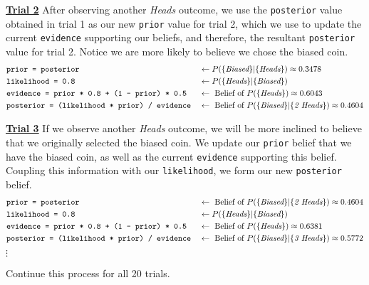 \underline{\textbf{Trial 2}}
\newline
After observing another \textit{Heads} outcome, we use the \texttt{posterior} value obtained in trial 1 as our new \texttt{prior} value for trial 2, which we use to update the current \texttt{evidence} supporting our beliefs, and therefore, the resultant \texttt{posterior} value for trial 2. Notice we are more likely to believe we chose the biased coin.
\begin{align*}
    &\texttt{prior = posterior} &&\leftarrow P(\{\textit{Biased}\} | \{\textit{Heads}\}) \approx 0.3478 \\
    &\texttt{likelihood = 0.8} &&\leftarrow P(\{\textit{Heads}\} | \{\textit{Biased}\}) \\
    &\texttt{evidence = prior * 0.8 + (1 - prior) * 0.5} &&\leftarrow \textnormal{ Belief of } P(\{\textit{Heads}\}) \approx 0.6043 \\
    &\texttt{posterior = (likelihood * prior) / evidence} &&\leftarrow \textnormal{ Belief of } P(\{\textit{Biased}\} | \{\textit{2 Heads}\}) \approx 0.4604
\end{align*}

\underline{\textbf{Trial 3}}
\newline
If we observe another \textit{Heads} outcome, we will be more inclined to believe that we originally selected the biased coin. We update our \texttt{prior} belief that we have the biased coin, as well as the current \texttt{evidence} supporting this belief. Coupling this information with our \texttt{likelihood}, we form our new \texttt{posterior} belief.
\begin{align*}
    &\texttt{prior = posterior} &&\leftarrow \textnormal{ Belief of } P(\{\textit{Biased}\} | \{\textit{2 Heads}\}) \approx 0.4604 \\
    &\texttt{likelihood = 0.8} &&\leftarrow P(\{\textit{Heads}\} | \{\textit{Biased}\}) \\
    &\texttt{evidence = prior * 0.8 + (1 - prior) * 0.5} &&\leftarrow \textnormal{ Belief of } P(\{\textit{Heads}\}) \approx 0.6381 \\
    &\texttt{posterior = (likelihood * prior) / evidence} &&\leftarrow \textnormal{ Belief of } P(\{\textit{Biased}\} | \{\textit{3 Heads}\}) \approx 0.5772
\end{align*}
\hspace{25 mm} \textbf{$\vdots$}

Continue this process for all 20 trials.

